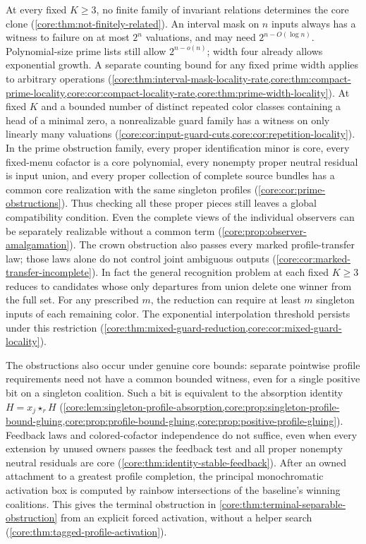 At every fixed $K\geq3$, no finite family of invariant relations determines
the core clone (\cref{core:thm:not-finitely-related}). An interval mask on $n$ inputs always has a witness to failure
on at most $2^n$ valuations, and may need $2^{n-O(\log n)}$.
Polynomial-size prime lists still allow $2^{n-o(n)}$; width four
already allows exponential growth. A separate counting bound for
any fixed prime width applies to arbitrary operations
(\cref{core:thm:interval-mask-locality-rate,core:thm:compact-prime-locality,core:cor:compact-locality-rate,core:thm:prime-width-locality}). At fixed $K$ and a bounded
number of distinct repeated color classes containing a head of a minimal zero, a
nonrealizable guard family has a witness on only linearly many valuations
(\cref{core:cor:input-guard-cuts,core:cor:repetition-locality}).
In the prime obstruction
family, every proper identification minor is core, every fixed-menu
cofactor is a core polynomial, every nonempty proper neutral residual
is input union, and every proper
collection of complete source bundles has a common core realization with
the same singleton profiles (\cref{core:cor:prime-obstructions}). Thus
checking all these proper pieces still leaves a global compatibility
condition. Even the complete views of the individual observers can be
separately realizable without a common term
(\cref{core:prop:observer-amalgamation}).
The crown obstruction also passes every marked profile-transfer law;
those laws alone do not control joint ambiguous outputs
(\cref{core:cor:marked-transfer-incomplete}).
In fact the general recognition problem at each fixed $K\geq3$
reduces to candidates whose only departures from union delete
one winner from the full set. For any prescribed $m$, the reduction
can require at least $m$ singleton inputs of each remaining color.
The exponential interpolation threshold persists under this restriction
(\cref{core:thm:mixed-guard-reduction,core:cor:mixed-guard-locality}).

The obstructions also occur under genuine core bounds: separate pointwise
profile requirements need not have a common bounded witness, even for a
single positive bit on a singleton coalition. Such a bit is equivalent
to the absorption identity $H=x_j\star_rH$
(\cref{core:lem:singleton-profile-absorption,core:prop:singleton-profile-bound-gluing,core:prop:profile-bound-gluing,core:prop:positive-profile-gluing}).
Feedback laws and colored-cofactor independence do not suffice, even
when every extension by unused owners passes the feedback test and all
proper nonempty neutral residuals are core
(\cref{core:thm:identity-stable-feedback}).
After an owned attachment to a greatest profile completion, the principal
monochromatic activation box is computed by rainbow intersections of
the baseline's winning coalitions. This gives the terminal obstruction
in \cref{core:thm:terminal-separable-obstruction} from an explicit forced
activation, without a helper search
(\cref{core:thm:tagged-profile-activation}).

